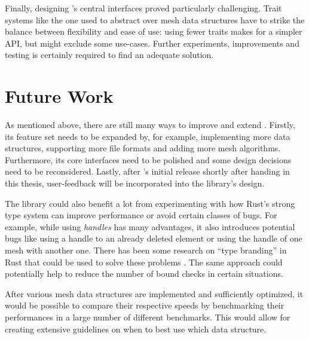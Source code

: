 Finally, designing 's central interfaces proved particularly challenging.
Trait systems like the one used to abstract over mesh data structures have to strike the balance between flexibility and ease of use:
using fewer traits makes for a simpler API, but might exclude some use-cases.
Further experiments, improvements and testing is certainly required to find an adequate solution.

\vspace{1cm}

\newpage
\section{Future Work}

As mentioned above, there are still many ways to improve and extend .
Firstly, its feature set needs to be expanded by, for example, implementing more data structures, supporting more file formats and adding more mesh algorithms.
Furthermore, its core interfaces need to be polished and some design decisions need to be reconsidered.
Lastly, after 's initial release shortly after handing in this thesis, user-feedback will be incorporated into the library's design.

The library could also benefit a lot from experimenting with how Rust's strong type system can improve performance or avoid certain classes of bugs.
For example, while using \emph{handles} has many advantages, it also introduces potential bugs like using a handle to an already deleted element or using the handle of one mesh with another one.
There has been some research on \enquote{type branding} in Rust that could be used to solve these problems \cite{beingessner2016you, indexing}.
The same approach could potentially help to reduce the number of bound checks in certain situations.

After various mesh data structures are implemented and sufficiently optimized, it would be possible to compare their respective speeds by benchmarking their performances in a large number of different benchmarks.
This would allow for creating extensive guidelines on when to best use which data structure.



